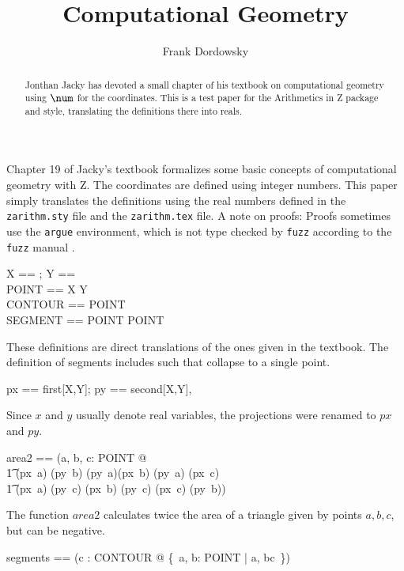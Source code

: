 \documentclass[12pt]{scrartcl}
\begin{document}
\title{Computational Geometry}
\author{Frank Dordowsky}

\maketitle

\begin{abstract}
  Jonthan Jacky has devoted a small chapter of his textbook
  \cite{Jacky1997a} on computational geometry using $\num$ for the
  coordinates. This is a test paper for the Arithmetics in Z package
  and style, translating the definitions there into reals.
\end{abstract}


Chapter 19 of Jacky's textbook \cite{Jacky1997a} formalizes some basic
concepts of computational geometry with Z. The  coordinates are
defined using integer numbers. This paper simply translates the
definitions using the real numbers defined in the \texttt{zarithm.sty}
file and the \texttt{zarithm.tex} file.
%
A note on proofs: Proofs sometimes use the \texttt{argue} environment,
which is not type checked by \texttt{fuzz} according to the
\texttt{fuzz} manual \cite{Spivey2000}.
%
\begin{zed}
  X == \real; Y == \real \\
  POINT == X \cross Y \\
  CONTOUR == \seq POINT \\
  SEGMENT == POINT \cross POINT \\
\end{zed}
%
These definitions are direct translations of the ones given in the
textbook. The definition of segments includes such that collapse to a
single point.
%
\begin{zed}
  px == first[X,Y]; py == second[X,Y], 
\end{zed}
%
Since $x$ and $y$ usually denote real variables, the projections were
renamed to $px$ and $py$.
%
\begin{zed}
  area2 == (\lambda a, b, c: POINT @ \\
  \t1 (px~a) \amult (py~b) \aminus (py~a)\amult (px~b) \aplus (py~a)\amult
  (px~c) \\
  \t1 \aminus (px~a) \amult (py~c) \aplus (px~b) \amult (py~c) \aminus
  (px~c) \amult (py~b))
\end{zed}
%
The function $area2$ calculates twice the area of a triangle given by
points $a,b,c$, but can be negative. 
%
\begin{zed}
  segments == (\lambda c : CONTOUR @ \{~a, b: POINT | \langle a,
  b\rangle \inseq c~\})
\end{zed}
\end{document}
